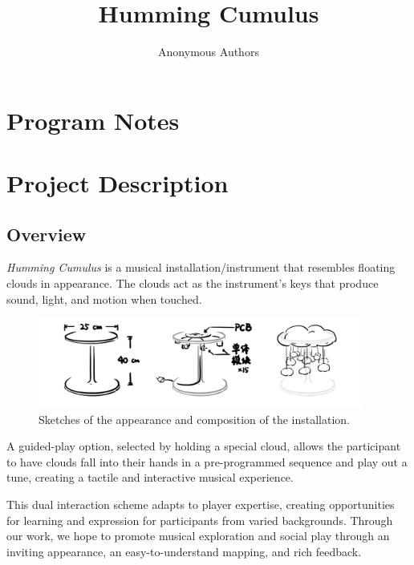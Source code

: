 \documentclass{nimemusic}
\begin{document}
\newcommand{\CuHum}{\textit{Humming Cumulus}}
\title{Humming Cumulus}

\author{Anonymous Authors}

\renewcommand{\shortauthors}{Authors, et al.}


\maketitle


\section{Program Notes}

\section{Project Description}
\subsection{Overview}
\CuHum{} is a musical installation/instrument that resembles floating clouds in appearance. The clouds act as the instrument's keys that produce sound, light, and motion when touched.

\begin{figure}[h!]
  \includegraphics[width=0.95\textwidth]{../../images/CuHum_Appearance.jpg}
  \caption{Sketches of the appearance and composition of the installation.}
  \label{fig:Sketches}
\end{figure}

A guided-play option, selected by holding a special cloud, allows the participant to have clouds fall into their hands in a pre-programmed sequence and play out a tune, creating a tactile and interactive musical experience.

This dual interaction scheme adapts to player expertise, creating opportunities for learning and expression for participants from varied backgrounds. Through our work, we hope to promote musical exploration and social play through an inviting appearance, an easy-to-understand mapping, and rich feedback.
\end{document}
